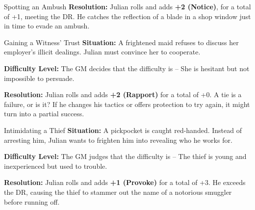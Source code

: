 \begin{multicols}{2}
\begin{Example}{Spotting an Ambush}
		\noindent\textbf{Resolution:} Julian rolls  and adds  \textbf{+2 (Notice)}, for a total of +1, meeting the DR. He catches the reflection of a blade in a shop window just in time to evade an ambush.
	\end{Example}


	\begin{Example}{Gaining a Witness’ Trust}
		\textbf{Situation:} A frightened maid refuses to discuss her employer’s illicit dealings. Julian must convince her to cooperate.

		\noindent\textbf{Difficulty Level:} The GM decides that the difficulty is \Challenging – She is hesitant but not impossible to persuade.

		\noindent\textbf{Resolution:} Julian rolls \FudgeRes{+---} and adds \textbf{+2 (Rapport)} for a total of +0. A tie is a failure, or is it? If he changes his tactics or offers protection to try again, it might turn into a partial success.
	\end{Example}


	\begin{Example}{Intimidating a Thief}
		\textbf{Situation:} A pickpocket is caught red-handed. Instead of arresting him, Julian wants to frighten him into revealing who he works for.

		\noindent\textbf{Difficulty Level:} The GM judges that the difficulty is \Basic – The thief is young and inexperienced but used to trouble.

		\noindent\textbf{Resolution:} Julian rolls  and adds \textbf{+1 (Provoke)} for a total of +3. He exceeds the DR, causing the thief to stammer out the name of a notorious smuggler before running off.
	\end{Example}

	\end{multicols}

\EndBoxPage